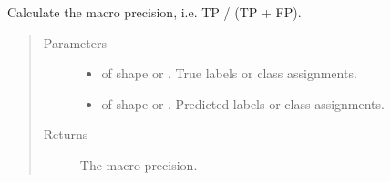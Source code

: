\documentclass[letterpaper,10pt,english]{sphinxmanual}
\begin{document}
\begin{fulllineitems}
\label{\detokenize{pusion.evaluation.evaluation_metrics:pusion.evaluation.evaluation_metrics.macro_precision}}
\sphinxAtStartPar
Calculate the macro precision, i.e. TP / (TP + FP).
\begin{quote}\begin{description}
\item[{Parameters}] \leavevmode\begin{itemize}
\item {} 
\sphinxAtStartPar
{} \textendash{}  of shape  or . True labels or class assignments.

\item {} 
\sphinxAtStartPar
{} \textendash{}  of shape  or . Predicted labels or
class assignments.

\end{itemize}

\item[{Returns}] \leavevmode
\sphinxAtStartPar
The macro precision.

\end{description}\end{quote}

\end{fulllineitems}

\end{document}
